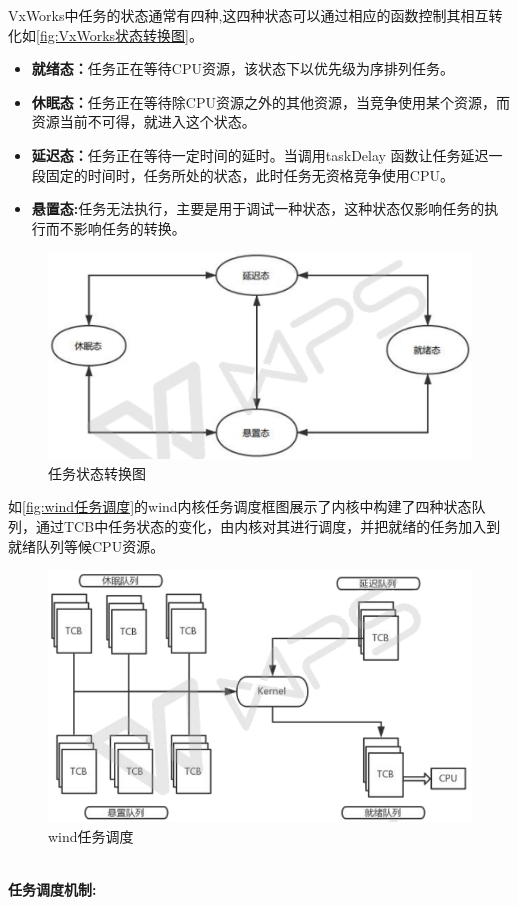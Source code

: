 	VxWorks中任务的状态通常有四种,这四种状态可以通过相应的函数控制其相互转化如\autoref{fig:VxWorks状态转换图}。
\begin{itemize}
\item \textbf{就绪态：}任务正在等待CPU资源，该状态下以优先级为序排列任务。
\item \textbf{休眠态：}任务正在等待除CPU资源之外的其他资源，当竞争使用某个资源，而资源当前不可得，就进入这个状态。
\item \textbf{延迟态：}任务正在等待一定时间的延时。当调用taskDelay 函数让任务延迟一段固定的时间时，任务所处的状态，此时任务无资格竞争使用CPU。
\item \textbf{悬置态:}任务无法执行，主要是用于调试一种状态，这种状态仅影响任务的执行而不影响任务的转换。
\end{itemize}

\begin{figure}[!h]
\centering
\includegraphics[width=.9\textwidth]{./graphics/vxworks-task-shift-diagram.pdf}
\caption{任务状态转换图}\label{fig:VxWorks状态转换图}
\end{figure}

	如\autoref{fig:wind任务调度}的wind内核任务调度框图展示了内核中构建了四种状态队列，通过TCB中任务状态的变化，由内核对其进行调度，并把就绪的任务加入到就绪队列等候CPU资源。
\begin{figure}[!h]
\centering
\includegraphics[width=.9\textwidth]{./graphics/vxworks-task-scheduling-diagram.pdf}
\caption{wind任务调度}\label{fig:wind任务调度}
\end{figure}\\
\textbf{任务调度机制:}

